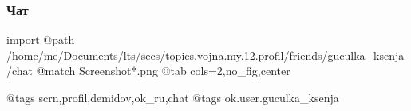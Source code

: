 
 
 
 
 

\subsubsection{Чат}

\ifcmt
  import
  @path /home/me/Documents/lts/secs/topics.vojna.my.12.profil/friends/guculka_ksenja/chat
  @match Screenshot*.png
  @tab cols=2,no_fig,center

  @tags scrn,profil,demidov,ok_ru,chat
  @tags ok.user.guculka_ksenja

\fi
